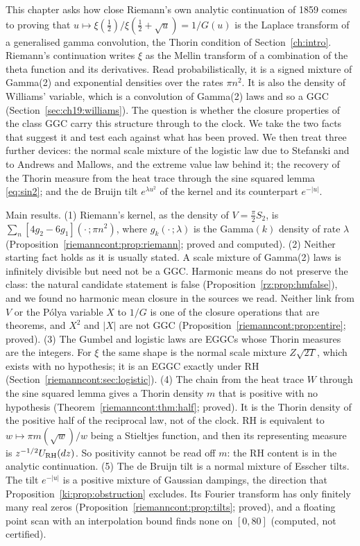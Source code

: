 This chapter asks how close Riemann's own analytic continuation of 1859 \cite{NCRiemann1859} comes to proving that $u\mapsto\xi(\frac12)/\xi(\frac12+\sqrt u)=1/G(u)$ is the Laplace transform of a generalised gamma convolution, the Thorin condition of Section~\ref{ch:intro}. Riemann's continuation writes $\xi$ as the Mellin transform of a combination of the theta function and its derivatives. Read probabilistically, it is a signed mixture of Gamma(2) and exponential densities over the rates $\pi n^2$. It is also the density of Williams' variable, which is a convolution of Gamma(2) laws and so a GGC (Section~\ref{sec:ch19:williams}). The question is whether the closure properties of the class GGC carry this structure through to the clock. We take the two facts that suggest it and test each against what has been proved. We then treat three further devices: the normal scale mixture of the logistic law due to Stefanski and to Andrews and Mallows, and the extreme value law behind it; the recovery of the Thorin measure from the heat trace through the sine squared lemma \eqref{eq:sin2}; and the de Bruijn tilt $e^{\lambda u^2}$ of the kernel and its counterpart $e^{-|u|}$.

Main results. (1) Riemann's kernel, as the density of $V=\frac\pi2S_2$, is $\sum_n[4g_2-6g_1](\cdot\,;\pi n^2)$, where $g_k(\cdot\,;\lambda)$ is the Gamma$(k)$ density of rate $\lambda$ (Proposition~\ref{riemanncont:prop:riemann}; proved and computed). (2) Neither starting fact holds as it is usually stated. A scale mixture of Gamma(2) laws is infinitely divisible but need not be a GGC. Harmonic means do not preserve the class: the natural candidate statement is false (Proposition~\ref{rz:prop:hmfalse}), and we found no harmonic mean closure in the sources we read. Neither link from $V$ or the P\'olya variable $X$ to $1/G$ is one of the closure operations that are theorems, and $X^2$ and $|X|$ are not GGC (Proposition~\ref{riemanncont:prop:entire}; proved). (3) The Gumbel and logistic laws are EGGCs whose Thorin measures are the integers. For $\xi$ the same shape is the normal scale mixture $Z\sqrt{2T}$, which exists with no hypothesis; it is an EGGC exactly under RH (Section~\ref{riemanncont:sec:logistic}). (4) The chain from the heat trace $W$ through the sine squared lemma gives a Thorin density $m$ that is positive with no hypothesis (Theorem~\ref{riemanncont:thm:half}; proved). It is the Thorin density of the positive half of the reciprocal law, not of the clock. RH is equivalent to $w\mapsto\pi m(\sqrt w)/w$ being a Stieltjes function, and then its representing measure is $z^{-1/2}U_{\mathrm{RH}}(dz)$. So positivity cannot be read off $m$: the RH content is in the analytic continuation. (5) The de Bruijn tilt is a normal mixture of Esscher tilts. The tilt $e^{-|u|}$ is a positive mixture of Gaussian dampings, the direction that Proposition~\ref{ki:prop:obstruction} excludes. Its Fourier transform has only finitely many real zeros (Proposition~\ref{riemanncont:prop:tilts}; proved), and a floating point scan with an interpolation bound finds none on $[0,80]$ (computed, not certified).

